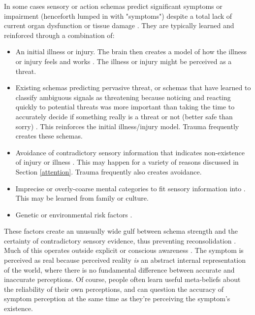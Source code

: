 \documentclass[12pt,letterpaper]{book}
\begin{document}
In some cases sensory or action schemas predict significant symptoms or impairment (henceforth lumped in with "symptoms") despite a total lack of current organ dysfunction or tissue damage \cite{berghPsychogenic}. They are typically learned and reinforced through a combination of:
\begin{itemize}
    \item An initial illness or injury. The brain then creates a model of how the illness or injury feels and works \cite{berghPsychogenic}. The illness or injury might be perceived as a threat.
    \item Existing schemas predicting pervasive threat, or schemas that have learned to classify ambiguous signals as threatening because noticing and reacting quickly to potential threats was more important than taking the time to accurately decide if something really is a threat or not (better safe than sorry) \cite{berghSelfEvidencing}. This reinforces the initial illness/injury model. Trauma frequently creates these schemas.
    \item Avoidance of contradictory sensory information that indicates non-existence of injury or illness \cite{berghSelfEvidencing}. This may happen for a variety of reasons discussed in Section \ref{attention}. Trauma frequently also creates avoidance.
    \item Imprecise or overly-coarse mental categories to fit sensory information into \cite{berghPsychogenic}. This may be learned from family or culture.
    \item Genetic or environmental risk factors \cite{berghPsychogenic}.
\end{itemize}
These factors create an unusually wide gulf between schema strength and the certainty of contradictory sensory evidence, thus preventing reconsolidation \cite{berghPsychogenic}. Much of this operates outside explicit or conscious awareness \cite{clark2015surfing}. The symptom is perceived as real because perceived reality \textit{is} an abstract internal representation of the world, where there is no fundamental difference between accurate and inaccurate perceptions. Of course, people often learn useful meta-beliefs about the reliability of their own perceptions, and can question the accuracy of symptom perception at the same time as they're perceiving the symptom's existence.
\end{document}
